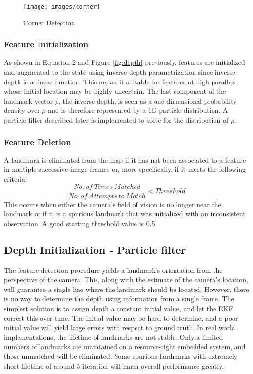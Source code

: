 \documentclass[conference]{IEEEtran}
\begin{document}
\begin{figure}[h]
\centering
\texttt{[image: images/corner]}
\caption{Corner Detection}
\label{fig:corner}
\end{figure}

\subsubsection{Feature Initialization}
As shown in Equation 2 and Figure \ref{fig:depth} previously, features are initialized and augmented to the state using inverse depth parametrization since inverse depth is a linear function. This makes it suitable for features at high parallax whose initial location may be highly uncertain. The last component of the landmark vector $\rho$, the inverse depth, is seen as a one-dimensional probability density over $\rho$ and is therefore represented by a 1D particle distribution. A particle filter described later is implemented to solve for the distribution of $\rho$.

\subsubsection{Feature Deletion}
A landmark is eliminated from the map if it has not been associated to a feature in multiple successive image frames or, more specifically, if it meets the following criteria:
\begin{equation}
\frac{No.~of~ Times~ Matched}{No.~of~ Attempts~ to~ Match} < Threshold
\end{equation}
This occurs when either the camera's field of vision is no longer near the landmark or if it is a spurious landmark that was initialized with an inconsistent observation. A good starting threshold value is 0.5. 

\subsection{Depth Initialization - Particle filter}
The feature detection procedure yields a landmark's orientation from the perspective of the camera. This, along with the estimate of the camera's location, will guarantee a single line where the landmark should be located. However, there is no way to determine the depth using information from a single frame. The simplest solution is to assign depth a constant initial value, and let the EKF correct this over time. The initial value may be hard to determine, and a poor initial value will yield large errors with respect to ground truth. In real world implementations, the lifetime of landmarks are not stable. Only a limited numbers of landmarks are maintained on a resource-tight embedded system, and those unmatched will be eliminated. Some spurious landmarks with extremely short lifetime of around 5 iteration will harm overall performance greatly.
\end{document}
